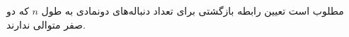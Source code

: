 \EXERCISE
مطلوب است تعیین رابطه بازگشتی برای تعداد دنباله‌های دونمادی به طول
$n$
که دو صفر متوالی ندارند.